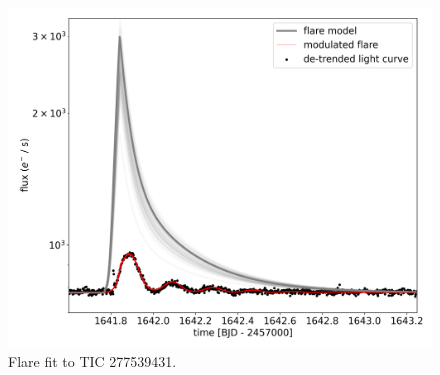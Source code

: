 \documentclass[fleqn,usenatbib,letters]{mnras}%
\newcommand{\FA}{TIC 277539431} %
\begin{document}
\begin{figure}
	\includegraphics[width=\columnwidth]{figures/08_07_2020_11_48_TIC277539431_flarefit_50retrievals.png}
    \caption{Flare fit to \FA.}
    \label{fig:fit\FA}
\end{figure}
\end{document}

